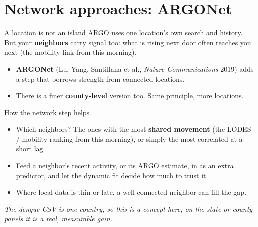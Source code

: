 \documentclass[aspectratio=169,11pt]{beamer}
\begin{document}
\section{Network approaches: ARGONet}

\begin{frame}{A location is not an island}
  ARGO uses one location's own search and history. But your \textbf{neighbors} carry signal
  too: what is rising next door often reaches you next (the mobility link from this morning).
  \begin{center}
  \end{center}
  \vspace{0.2em}
  \begin{itemize}
    \item \textbf{ARGONet} (Lu, Yang, Santillana et al., \emph{Nature Communications} 2019)
          adds a step that borrows strength from connected locations.
    \item There is a finer \textbf{county-level} version too. Same principle, more locations.
  \end{itemize}
\end{frame}

\begin{frame}{How the network step helps}
  \begin{itemize}
    \item Which neighbors? The ones with the most \textbf{shared movement} (the LODES /
          mobility ranking from this morning), or simply the most correlated at a short lag.
    \item Feed a neighbor's recent activity, or its ARGO estimate, in as an extra predictor,
          and let the dynamic fit decide how much to trust it.
    \item Where local data is thin or late, a well-connected neighbor can fill the gap.
  \end{itemize}
  \vspace{0.3em}
  \begin{center}
    \itshape The dengue CSV is one country, so this is a concept here; on the state or county
    panels it is a real, measurable gain.
  \end{center}
\end{frame}
\end{document}
